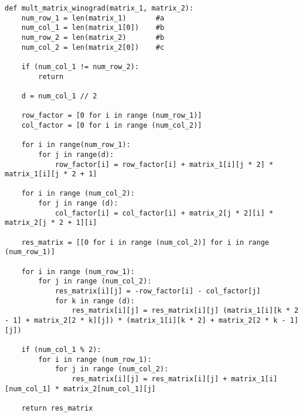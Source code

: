 \begin{lstlisting}[caption=Алгоритм Винограда]
def mult_matrix_winograd(matrix_1, matrix_2):
    num_row_1 = len(matrix_1)       #a
    num_col_1 = len(matrix_1[0])    #b
    num_row_2 = len(matrix_2)       #b
    num_col_2 = len(matrix_2[0])    #c

    if (num_col_1 != num_row_2):
        return

    d = num_col_1 // 2

    row_factor = [0 for i in range (num_row_1)]
    col_factor = [0 for i in range (num_col_2)]

    for i in range(num_row_1):
        for j in range(d):
            row_factor[i] = row_factor[i] + matrix_1[i][j * 2] * matrix_1[i][j * 2 + 1]

    for i in range (num_col_2):
        for j in range (d):
            col_factor[i] = col_factor[i] + matrix_2[j * 2][i] * matrix_2[j * 2 + 1][i]

    res_matrix = [[0 for i in range (num_col_2)] for i in range (num_row_1)]

    for i in range (num_row_1):
        for j in range (num_col_2):
            res_matrix[i][j] = -row_factor[i] - col_factor[j]
            for k in range (d):
                res_matrix[i][j] = res_matrix[i][j] (matrix_1[i][k * 2 - 1] + matrix_2[2 * k][j]) * (matrix_1[i][k * 2] + matrix_2[2 * k - 1][j])

    if (num_col_1 % 2):
        for i in range (num_row_1):
            for j in range (num_col_2):
                res_matrix[i][j] = res_matrix[i][j] + matrix_1[i][num_col_1] * matrix_2[num_col_1][j]

    return res_matrix
\end{lstlisting}

